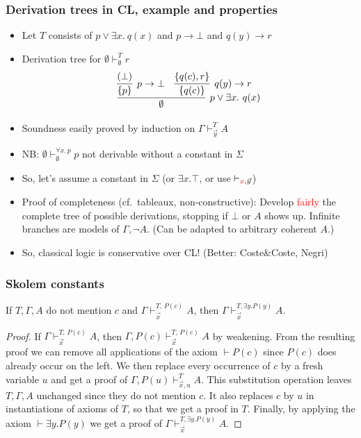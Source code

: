 \documentclass[handout,11pt,hyperref ={colorlinks = true, urlcolor = red}]{beamer}
\newcommand{\red}[1]{\textcolor{red}{#1}}
\newcommand{\set}[1]{\{#1\}}
\begin{document}
\begin{frame}\label{proofsearch}
\frametitle{Derivation trees in CL, example and properties}
 \begin{itemize}[<+->]   %
    \item Let $T$ consists of $p\lor \exists x.~q(x)$ 
    and $p\to\bot$ and $q(y)\to r$
    \item Derivation tree for $\emptyset\vdash_{\emptyset}^T r$
    \[
\infer[p\vee \exists x.~q(x)]{\emptyset}
{
\infer[p\to\bot]{\set{p}}{(\bot)} & \infer[q(y)\to r]{\set{q(c)}}{\set{q(c),r}}
}
\]
\item Soundness easily proved by induction on $\Gamma\vdash_{\vec{y}}^T A$
    \item NB: $\emptyset\vdash_{\emptyset}^{\forall x.\,p} p$
     not derivable without a constant in $\Sigma$
    \item So, let's assume a constant in $\Sigma$ (or $\exists x.\top$,
    or use $\vdash_{\red{x},\vec{y}}$)
    \item Proof of completeness (cf.\ tableaux, non-constructive):
    Develop \red{fairly} the complete tree of possible derivations,
    stopping if $\bot$ or $A$ shows up. Infinite branches are models 
    of $\Gamma,\neg A$. (Can be adapted to arbitrary coherent $A$.)
    \item So, classical logic is conservative over CL! (Better: Coste\&Coste, Negri)
 \end{itemize}
\end{frame}

\begin{frame}
\frametitle{Skolem constants}
\begin{theorem}
If $T,\Gamma,A$ do not mention $c$ and $\Gamma\vdash_{\vec{x}}^{T,\,P(c)} A$, then
$\Gamma\vdash_{\vec{x}}^{T,\exists y. P(y)} A$.
\end{theorem}
\begin{proof} 
If $\Gamma\vdash_{\vec{x}}^{T,\,P(c)} A$, 
then $\Gamma,P(c)\vdash_{\vec{x}}^{T,\,P(c)} A$ by weakening.
From the resulting proof we can remove all applications of
the axiom $\vdash P(c)$ since $P(c)$ does already occur on the left. 
We then replace every occurrence of $c$ by a fresh variable $u$ and 
get a proof of $\Gamma,P(u)\vdash_{\vec{x},u}^{T} A$.
This substitution operation leaves $T,\Gamma,A$ unchanged
since they do not mention $c$.
It also replaces $c$ by $u$ in instantiations of axioms of $T$,
so that we get a proof in $T$. Finally,
by applying the axiom $\vdash\exists y. P(y)$
we get a proof of $\Gamma\vdash_{\vec{x}}^{T,\exists y. P(y)} A$.
\end{proof}
\end{frame}
\end{document}
